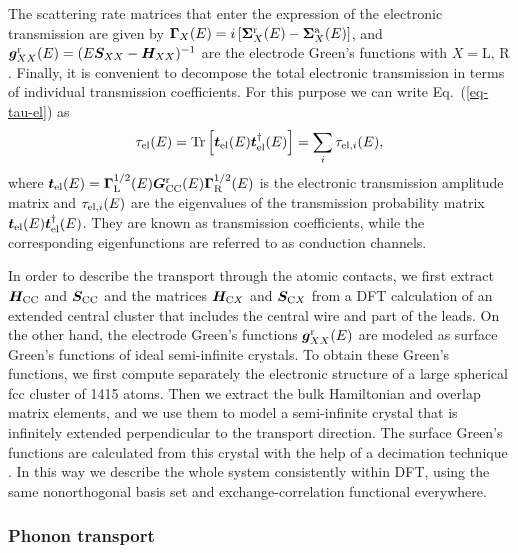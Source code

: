 \documentclass[aps,amsmath,amssymb,twocolumn,showpacs]{revtex4-1}
\begin{document}
%
The scattering rate matrices that enter the expression of the electronic
transmission are given by ${\boldsymbol \Gamma}_{X}(E) = i \left[ \boldsymbol
  \Sigma_{X}^{\rm r}(E) - \boldsymbol \Sigma_{X}^{\rm a}(E) \right]$, and
${\boldsymbol g}_{XX}^{\rm r}(E) = (E {\boldsymbol S}_{XX} - {\boldsymbol
  H}_{XX})^{-1}$ are the electrode Green's functions with $X=\mbox{L,
  R}$. Finally, it is convenient to decompose the total electronic
transmission in terms of individual transmission coefficients. For this
purpose we can write Eq.~(\ref{eq-tau-el}) as
%
\begin{equation}
\tau_{\rm el}(E) = \mathrm{Tr} \left[ \boldsymbol t_{\rm el}(E) \boldsymbol 
t^{\dagger}_{\rm el} (E) \right] = \sum_i \tau_{{\rm el},i}(E) ,
\label{eq-tau-chan}
\end{equation}
%
where $\boldsymbol t_{\rm el}(E) = \boldsymbol \Gamma^{1/2}_{\rm L}(E)
\boldsymbol G_{\rm CC}^{\rm r}(E) \boldsymbol \Gamma^{1/2}_{\rm R}(E)$ is the
electronic transmission amplitude matrix and $\tau_{{\rm el},i}(E)$ are the
eigenvalues of the transmission probability matrix $\boldsymbol t_{\rm el}(E)
\boldsymbol t^{\dagger}_{\rm el}(E)$. They are known as transmission
coefficients, while the corresponding eigenfunctions are referred to as
conduction channels.

In order to describe the transport through the atomic contacts, we first
extract $\boldsymbol H_{\rm CC}$ and $\boldsymbol S_{\rm CC}$ and the matrices
$\boldsymbol H_{{\rm C}X}$ and $\boldsymbol S_{{\rm C}X}$ from a DFT
calculation of an extended central cluster that includes the central wire and
part of the leads.  On the other hand, the electrode Green's functions
$\boldsymbol g_{XX}^{\rm r}(E)$ are modeled as surface Green's functions of
ideal semi-infinite crystals. To obtain these Green's functions, we first
compute separately the electronic structure of a large spherical fcc cluster 
of 1415 atoms. Then we extract the bulk Hamiltonian and overlap matrix elements, 
and we use them to model a semi-infinite crystal that is infinitely extended
perpendicular to the transport direction. The surface Green's functions are
calculated from this crystal with the help of a decimation technique
\cite{Pauly2008,Guinea1983}. In this way we describe the whole system
consistently within DFT, using the same nonorthogonal basis set and
exchange-correlation functional everywhere.

\subsubsection{Phonon transport}
\end{document}
